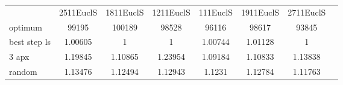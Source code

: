 \begin{tabular}[ht]{|l||c|c|c|c|c|c|H}
 & 2511EuclS & 1811EuclS & 1211EuclS & 111EuclS & 1911EuclS & 2711EuclS & \\  
optimum &99195 & 100189 & 98528 & 96116 & 98617 & 93845 & \\ 
best step ls &1.00605 & 1 & 1 & 1.00744 & 1.01128 & 1 & \\ 
3 apx &1.19845 & 1.10865 & 1.23954 & 1.09184 & 1.10833 & 1.13838 & \\ 
random &1.13476 & 1.12494 & 1.12943 & 1.1231 & 1.12784 & 1.11763 & \\ 
\end{tabular}
